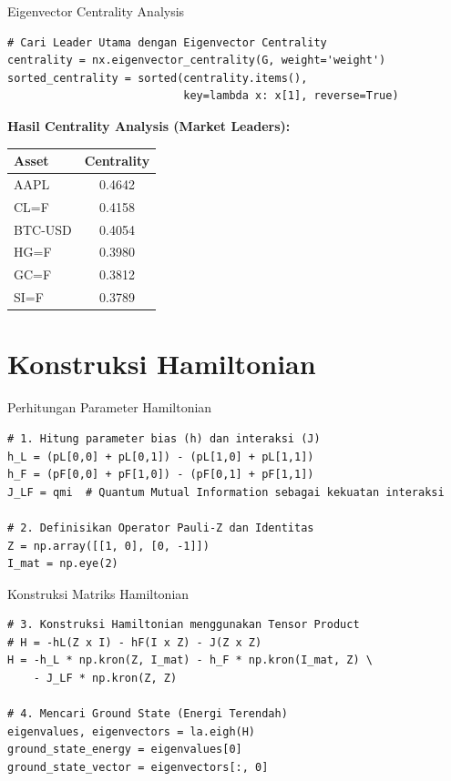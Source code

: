 \documentclass[aspectratio=169]{beamer}
\begin{document}
\begin{frame}[fragile]{Eigenvector Centrality Analysis}
\begin{lstlisting}
# Cari Leader Utama dengan Eigenvector Centrality
centrality = nx.eigenvector_centrality(G, weight='weight')
sorted_centrality = sorted(centrality.items(), 
                           key=lambda x: x[1], reverse=True)
\end{lstlisting}

\vspace{0.3cm}

\textbf{Hasil Centrality Analysis (Market Leaders):}
\begin{table}
    \centering
    \begin{tabular}{lc}
        \toprule
        \textbf{Asset} & \textbf{Centrality} \\
        \midrule
        AAPL & 0.4642 \\
        CL=F & 0.4158 \\
        BTC-USD & 0.4054 \\
        HG=F & 0.3980 \\
        GC=F & 0.3812 \\
        SI=F & 0.3789 \\
        \bottomrule
    \end{tabular}
\end{table}
\end{frame}

\section{Konstruksi Hamiltonian}

\begin{frame}[fragile]{Perhitungan Parameter Hamiltonian}
\begin{lstlisting}
# 1. Hitung parameter bias (h) dan interaksi (J)
h_L = (pL[0,0] + pL[0,1]) - (pL[1,0] + pL[1,1])
h_F = (pF[0,0] + pF[1,0]) - (pF[0,1] + pF[1,1])
J_LF = qmi  # Quantum Mutual Information sebagai kekuatan interaksi

# 2. Definisikan Operator Pauli-Z dan Identitas
Z = np.array([[1, 0], [0, -1]])
I_mat = np.eye(2)
\end{lstlisting}
\end{frame}

\begin{frame}[fragile]{Konstruksi Matriks Hamiltonian}
\begin{lstlisting}
# 3. Konstruksi Hamiltonian menggunakan Tensor Product
# H = -hL(Z x I) - hF(I x Z) - J(Z x Z)
H = -h_L * np.kron(Z, I_mat) - h_F * np.kron(I_mat, Z) \
    - J_LF * np.kron(Z, Z)

# 4. Mencari Ground State (Energi Terendah)
eigenvalues, eigenvectors = la.eigh(H)
ground_state_energy = eigenvalues[0]
ground_state_vector = eigenvectors[:, 0]
\end{lstlisting}
\end{frame}
\end{document}
